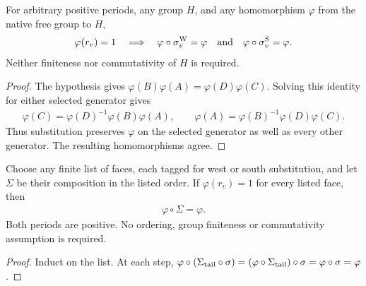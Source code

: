 \begin{lemma}
    \label{lem:peps_dual_face_elimination_representations}
    \leanok
    For arbitrary positive periods, any group $H$, and any homomorphism
    $\varphi$ from the native free group to $H$,
    \begin{align}
        \varphi(r_v)=1
        \quad\Longrightarrow\quad
        \varphi\circ\sigma_v^{\rm W}=\varphi
        \quad\hbox{and}\quad
        \varphi\circ\sigma_v^{\rm S}=\varphi.
        \label{eq:peps_dual_face_elimination_representation}
    \end{align}
    Neither finiteness nor commutativity of $H$ is required.
\end{lemma}
\begin{proof}\leanok
    The hypothesis gives $\varphi(B)\varphi(A)=\varphi(D)\varphi(C)$.
    Solving this identity for either selected generator gives
    \begin{align}
        \varphi(C)=\varphi(D)^{-1}\varphi(B)\varphi(A),\qquad
        \varphi(A)=\varphi(B)^{-1}\varphi(D)\varphi(C).
        \label{eq:peps_dual_face_elimination_flat_equation}
    \end{align}
    Thus substitution preserves $\varphi$ on the selected generator as well
    as every other generator. The resulting homomorphisms agree.
\end{proof}

\begin{lemma}
    \label{lem:peps_dual_face_elimination_sequence}
    \leanok
    Choose any finite list of faces, each tagged for west or south substitution,
    and let $\Sigma$ be their composition in the listed order.
    If $\varphi(r_v)=1$ for every listed face, then
    \begin{align}
        \varphi\circ\Sigma=\varphi.
        \label{eq:peps_dual_face_elimination_sequence}
    \end{align}
    Both periods are positive. No ordering, group finiteness or commutativity
    assumption is required.
\end{lemma}
\begin{proof}\leanok
    Induct on the list. At each step,
    $\varphi\circ(\Sigma_{\rm tail}\circ\sigma)
        =(\varphi\circ\Sigma_{\rm tail})\circ\sigma
        =\varphi\circ\sigma=\varphi$.
\end{proof}
